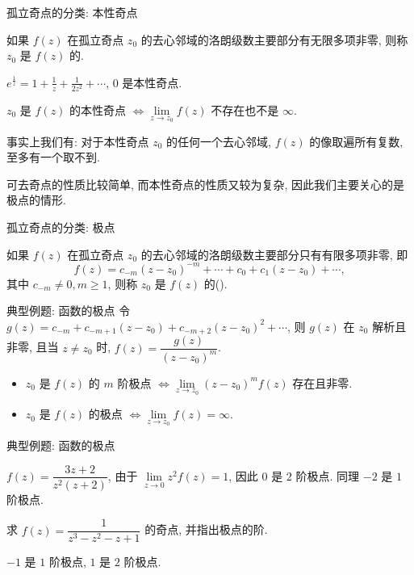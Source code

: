 \begin{frame}{孤立奇点的分类: 本性奇点}
\begin{definition}
如果 $f(z)$ 在孤立奇点 $z_0$ 的去心邻域的洛朗级数主要部分有无限多项非零, 则称 $z_0$ 是 $f(z)$ 的.
\end{definition}
\begin{example}
$\displaystyle e^{\frac1z}=1+\frac1z+\frac1{2z^2}+\cdots$, $0$ 是本性奇点.
\end{example}

\begin{theorem}
$z_0$ 是 $f(z)$ 的本性奇点 $\iff\lim\limits_{z\to z_0}f(z)$ 不存在也不是 $\infty$.
\end{theorem}

\onslide<+->
事实上我们有: 对于本性奇点 $z_0$ 的任何一个去心邻域, $f(z)$ 的像取遍所有复数, 至多有一个取不到.

\onslide<+->
可去奇点的性质比较简单, 而本性奇点的性质又较为复杂, 因此我们主要关心的是极点的情形.
\end{frame}


\begin{frame}{孤立奇点的分类: 极点}
\begin{definition}
如果 $f(z)$ 在孤立奇点 $z_0$ 的去心邻域的洛朗级数主要部分只有有限多项非零, 即
\[f(z)=c_{-m}(z-z_0)^{-m}+\cdots+c_0+c_1(z-z_0)+\cdots,\]
其中 $c_{-m}\neq 0,m\ge 1$, 则称 $z_0$ 是 $f(z)$ 的().
\end{definition}
\end{frame}


\begin{frame}{典型例题: 函数的极点}
\onslide<+->
令 $g(z)=c_{-m}+c_{-m+1}(z-z_0)+c_{-m+2}(z-z_0)^2+\cdots$, 则 $g(z)$ 在 $z_0$ 解析且非零,
\onslide<+->
且当 $z\neq z_0$ 时, $f(z)=\dfrac{g(z)}{(z-z_0)^m}$.

\begin{theorem}
\begin{itemize}
\item $z_0$ 是 $f(z)$ 的 $m$ 阶极点 $\iff\lim\limits_{z\to z_0}(z-z_0)^mf(z)$ 存在且非零.
\item $z_0$ 是 $f(z)$ 的极点 $\iff\lim\limits_{z\to z_0}f(z)=\infty$.
\end{itemize}
\end{theorem}
\end{frame}


\begin{frame}{典型例题: 函数的极点}
\begin{example}
$f(z)=\dfrac{3z+2}{z^2(z+2)}$,
\onslide<+->
由于 $\lim\limits_{z\to 0}z^2f(z)=1$, 因此 $0$ 是 $2$ 阶极点.
\onslide<+->
同理 $-2$ 是 $1$ 阶极点.
\end{example}

\begin{exercise}
求 $f(z)=\dfrac1{z^3-z^2-z+1}$ 的奇点, 并指出极点的阶.
\end{exercise}
\begin{answer}
$-1$ 是 $1$ 阶极点, $1$ 是 $2$ 阶极点.
\end{answer}
\end{frame}


